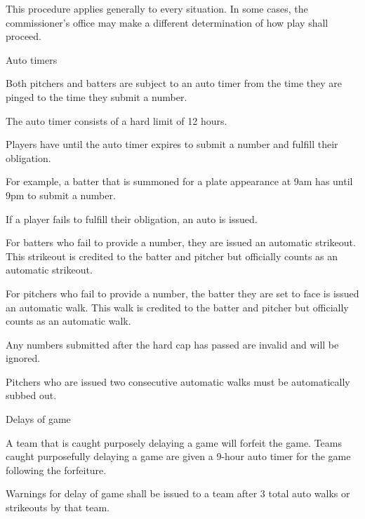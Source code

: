 \begin{deepEnumerate}
\begin{deepEnumerate}
\begin{deepEnumerate}
\begin{deepEnumerate}
				\item This procedure applies generally to every situation. 
				In some cases, the commissioner’s office may make a different determination of how play shall proceed.
			\end{deepEnumerate}
		\end{deepEnumerate}
	\end{deepEnumerate}
	\item Auto timers
	\begin{deepEnumerate}
		\item Both pitchers and batters are subject to an auto timer from the time they are pinged to the time they submit a number.
		\item The auto timer consists of a hard limit of 12 hours.
		\item Players have until the auto timer expires to submit a number and fulfill their obligation.
		\begin{deepEnumerate}
			\item For example, a batter that is summoned for a plate appearance at 9am has until 9pm to submit a number.
		\end{deepEnumerate}
		\item If a player fails to fulfill their obligation, an auto is issued.
		\begin{deepEnumerate}
			\item For batters who fail to provide a number, they are issued an automatic strikeout. 
			This strikeout is credited to the batter and pitcher but officially counts as an automatic strikeout.
			\item For pitchers who fail to provide a number, the batter they are set to face is issued an automatic walk. 
			This walk is credited to the batter and pitcher but officially counts as an automatic walk.
			\item Any numbers submitted after the hard cap has passed are invalid and will be ignored.
		\end{deepEnumerate}
		\item Pitchers who are issued two consecutive automatic walks must be automatically subbed out.
		\item Delays of game
		\begin{deepEnumerate}
			\item A team that is caught purposely delaying a game will forfeit the game. 
			Teams caught purposefully delaying a game are given a 9-hour auto timer for the game following the forfeiture.
			\item Warnings for delay of game shall be issued to a team after 3 total auto walks or strikeouts by that team.

\end{deepEnumerate}
\end{deepEnumerate}
\end{deepEnumerate}
